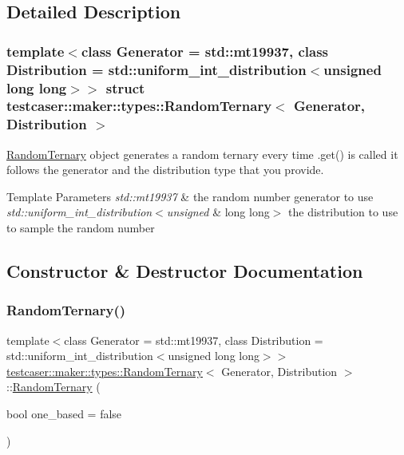 \subsection{Detailed Description}
\subsubsection*{template$<$class Generator = std\+::mt19937, class Distribution = std\+::uniform\+\_\+int\+\_\+distribution$<$unsigned long long$>$$>$\newline
struct testcaser\+::maker\+::types\+::\+Random\+Ternary$<$ Generator, Distribution $>$}

\mbox{\hyperlink{structtestcaser_1_1maker_1_1types_1_1RandomTernary}{Random\+Ternary}} object generates a random ternary every time .get() is called it follows the generator and the distribution type that you provide. 


\begin{DoxyTemplParams}{Template Parameters}
{\em std\+::mt19937} & the random number generator to use \\
\hline
{\em std\+::uniform\+\_\+int\+\_\+distribution$<$unsigned} & long long$>$ the distribution to use to sample the random number \\
\hline
\end{DoxyTemplParams}


\subsection{Constructor \& Destructor Documentation}
\mbox{\label{structtestcaser_1_1maker_1_1types_1_1RandomTernary_a5c6ffde5294c4e0f4e252772a48bd7fe}} 
\subsubsection{\texorpdfstring{RandomTernary()}{RandomTernary()}}
{\footnotesize\ttfamily template$<$class Generator = std\+::mt19937, class Distribution = std\+::uniform\+\_\+int\+\_\+distribution$<$unsigned long long$>$$>$ \\
\mbox{\hyperlink{structtestcaser_1_1maker_1_1types_1_1RandomTernary}{testcaser\+::maker\+::types\+::\+Random\+Ternary}}$<$ Generator, Distribution $>$\+::\mbox{\hyperlink{structtestcaser_1_1maker_1_1types_1_1RandomTernary}{Random\+Ternary}} (\begin{DoxyParamCaption}\item[{bool}]{one\+\_\+based = {\ttfamily false} }\end{DoxyParamCaption})\hspace{0.3cm}{\ttfamily [inline]}}



